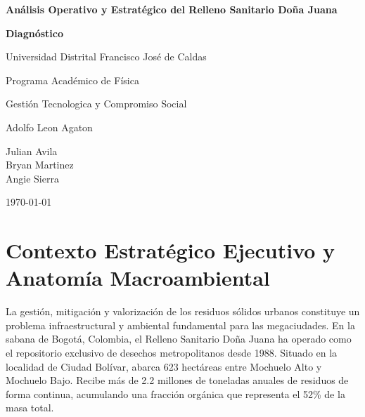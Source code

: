 \documentclass[11pt,letterpaper]{article}
\begin{document}
\begin{center}

  \vspace*{2cm}

  \textbf{Análisis Operativo y Estratégico del Relleno Sanitario Doña Juana}

  \vspace{0.5cm}

  \textbf{Diagnóstico}

  \vspace{3cm}

  Universidad Distrital Francisco José de Caldas

  \vspace{0.5cm}

  Programa Académico de Física

  \vspace{2cm}

  Gestión Tecnologica y Compromiso Social

  \vspace{0.5cm}

  Adolfo Leon Agaton

  \vspace{3cm}

  Julian Avila \\
  Bryan Martinez \\
  Angie Sierra

  \vspace{1.5cm}

  \today

\end{center}

\newpage

\tableofcontents
\newpage

\section{Contexto Estratégico Ejecutivo y Anatomía Macroambiental}

La gestión, mitigación y valorización de los residuos sólidos urbanos constituye
un problema infraestructural y ambiental fundamental para las megaciudades. En
la sabana de Bogotá, Colombia, el Relleno Sanitario Doña Juana ha operado como
el repositorio exclusivo de desechos metropolitanos desde 1988. Situado en la
localidad de Ciudad Bolívar, abarca 623 hectáreas entre Mochuelo Alto y Mochuelo
Bajo. Recibe más de 2.2 millones de toneladas anuales de residuos de forma
continua, acumulando una fracción orgánica que representa el 52\% de la masa
total.
\end{document}
